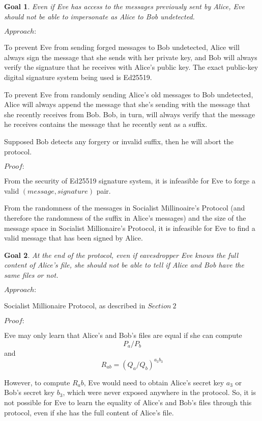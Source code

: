 \documentclass{article}
\newtheorem{goal}{Goal}
\begin{document}
\begin{goal}
Even if Eve has access to the messages previously sent by Alice, Eve should not
be able to impersonate as Alice to Bob undetected.
\end{goal}

$Approach:$

To prevent Eve from sending forged messages to Bob undetected, Alice will always sign the 
message that she sends with her private key, and Bob will always verify the signature that 
he receives with Alice's public key. The exact public-key digital signature system 
being used is Ed25519.

To prevent Eve from randomly sending Alice's old messages to Bob undetected, Alice will 
always append the message that she's sending with the message that she recently receives 
from Bob. Bob, in turn, will always verify that the message he receives contains 
the message that he recently sent as a suffix.

Supposed Bob detects any forgery or invalid suffix, then he will abort the protocol.

$Proof:$

From the security of Ed25519 signature system, it is infeasible for Eve to 
forge a valid $(message, signature)$ pair.

From the randomness of the messages in Socialist Millinoaire's Protocol (and therefore 
the randomness of the suffix in Alice's messages) and the size of the message space in 
Socialist Millionaire's Protocol, 
it is infeasible for Eve to find a valid message that has been signed by Alice.

\begin{goal}
At the end of the protocol, even if eavesdropper Eve knows the full content of Alice's file,
she should not be able to tell if Alice and Bob have the same files or not.
\end{goal}

$Approach:$ 

Socialist Millionaire Protocol, as described in $Section\ 2$

$Proof:$

Eve may only learn that Alice's and Bob's files are equal if she can compute 
$$P_a / P_b$$ and $$R_{ab} = (Q_a/Q_b)^{a_3b_3}$$

However, to compute $R_ab$, Eve would need to obtain Alice's secret key $a_3$
or Bob's secret key $b_3$, which were never exposed anywhere in the protocol.
So, it is not possible for Eve to learn the equality of Alice's and Bob's files 
through this protocol, even if she has the full content of Alice's file.
\end{document}

